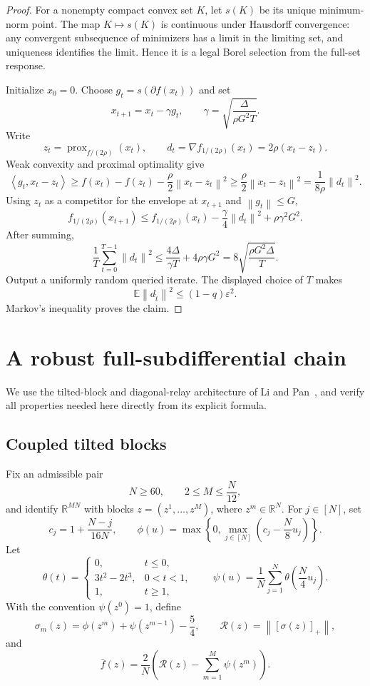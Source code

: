 \documentclass[11pt,a4paper]{article}
\newcommand{\R}{\mathbb{R}}
\newcommand{\E}{\mathbb{E}}
\newcommand{\eps}{\varepsilon}
\newcommand{\norm}[1]{\left\lVert #1\right\rVert}
\newcommand{\inner}[2]{\left\langle #1,#2\right\rangle}
\DeclareMathOperator{\prox}{prox}
\theoremstyle{definition}
\numberwithin{equation}{section}
\begin{document}
\begin{proof}
For a nonempty compact convex set $K$, let $s(K)$ be its unique minimum-norm point.  The map $K\mapsto s(K)$ is continuous under Hausdorff convergence: any convergent subsequence of minimizers has a limit in the limiting set, and uniqueness identifies the limit.  Hence it is a legal Borel selection from the full-set response.

Initialize $x_0=0$.  Choose $g_t=s(\partial f(x_t))$ and set
\[
 x_{t+1}=x_t-\gamma g_t,
 \qquad
 \gamma=\sqrt{\frac{\Delta}{\rho G^2T}}.
\]
Write
\[
 z_t=\prox_{f/(2\rho)}(x_t),
 \qquad
 d_t=\nabla f_{1/(2\rho)}(x_t)=2\rho(x_t-z_t).
\]
Weak convexity and proximal optimality give
\[
 \inner{g_t}{x_t-z_t}
 \ge f(x_t)-f(z_t)-\frac\rho2\norm{x_t-z_t}^2
 \ge\frac\rho2\norm{x_t-z_t}^2
 =\frac1{8\rho}\norm{d_t}^2.
\]
Using $z_t$ as a competitor for the envelope at $x_{t+1}$ and $\norm{g_t}\le G$,
\[
 f_{1/(2\rho)}(x_{t+1})
 \le f_{1/(2\rho)}(x_t)
 -\frac\gamma4\norm{d_t}^2+\rho\gamma^2G^2.
\]
After summing,
\[
 \frac1T\sum_{t=0}^{T-1}\norm{d_t}^2
 \le \frac{4\Delta}{\gamma T}+4\rho\gamma G^2
 =8\sqrt{\frac{\rho G^2\Delta}{T}}.
\]
Output a uniformly random queried iterate.  The displayed choice of $T$ makes
\[
 \E\norm{d_{\widehat t}}^2\le(1-q)\eps^2.
\]
Markov's inequality proves the claim.
\end{proof}

\section{A robust full-subdifferential chain}\label{sec:base}

We use the tilted-block and diagonal-relay architecture of
Li and Pan~\cite{LiPan2026v1}, and verify all properties needed here
directly from its explicit formula.

\subsection{Coupled tilted blocks}

Fix an admissible pair
\[
 N\ge60,
 \qquad
 2\le M\le\frac N{12},
\]
and identify $\R^{MN}$ with blocks $z=(z^1,\ldots,z^M)$, where $z^m\in\R^N$.  For $j\in[N]$, set
\[
 c_j=1+\frac{N-j}{16N},
 \qquad
 \phi(u)=\max\left\{0,\max_{j\in[N]}\left(c_j-\frac N8u_j\right)\right\}.
\]
Let
\[
 \theta(t)=
 \begin{cases}
 0,&t\le0,\\
 3t^2-2t^3,&0<t<1,\\
 1,&t\ge1,
 \end{cases}
 \qquad
 \psi(u)=\frac1N\sum_{j=1}^N\theta\!\left(\frac N4u_j\right).
\]
With the convention $\psi(z^0)=1$, define
\[
 \sigma_m(z)=\phi(z^m)+\psi(z^{m-1})-\frac54,
 \qquad
 \mathcal R(z)=\norm{[\sigma(z)]_+},
\]
and
\begin{equation}\label{eq:basef}
 \bar f(z)=\frac2N\left(\mathcal R(z)-\sum_{m=1}^M\psi(z^m)\right).
\end{equation}
\end{document}
